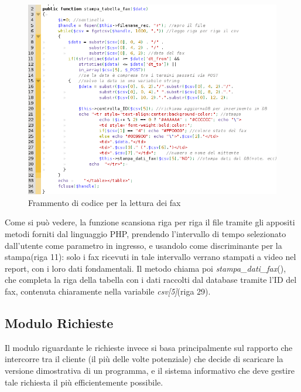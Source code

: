 \begin{figure}[!ht]
\centering
  \includegraphics[scale=0.6]{./images/codicefax.png}
\caption{Frammento di codice per la lettura dei fax}
\label{codice_fax}
\end{figure}

\noindent
Come si pu\`o vedere, la funzione scansiona riga per riga il file tramite gli appositi metodi forniti dal linguaggio PHP, prendendo l'intervallo di tempo selezionato dall'utente come parametro in ingresso, e usandolo come discriminante per la stampa(riga 11): solo i fax ricevuti in tale intervallo verrano stampati a video nel report, con i loro dati fondamentali. Il metodo chiama poi \textit{stampa\_{}dati\_{}fax}(), che completa la riga della tabella con i dati raccolti dal database tramite l'ID del fax, contenuta chiaramente nella variabile \textit{csv[5]}(riga 29).

\newpage
\subsection{Modulo Richieste}

Il modulo riguardante le richieste invece si basa principalmente sul rapporto che intercorre tra il cliente (il pi\`u delle volte potenziale) che decide di scaricare la versione dimostrativa di un programma, e il sistema informativo che deve gestire tale richiesta il pi\`u efficientemente possibile.

